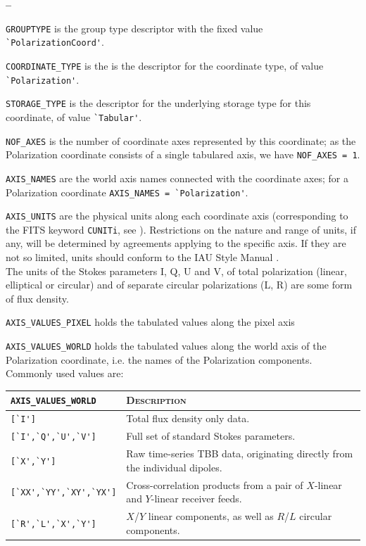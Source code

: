 \documentclass[a4paper,10pt,bibtotoc]{scrreprt}
\begin{document}
\begin{list}{\textbf{--}}{}
\item \verb|GROUPTYPE| is the group type descriptor with the fixed
  value \verb|`PolarizationCoord'|.
\item \verb|COORDINATE_TYPE| is the is the descriptor for the
  coordinate type, of value \verb|`Polarization'|.
\item \verb|STORAGE_TYPE| is the descriptor for the underlying storage
  type for this coordinate, of value \verb|`Tabular'|.
\item \verb|NOF_AXES| is the number of coordinate axes represented by
  this coordinate; as the Polarization coordinate consists of a single
  tabulared axis, we have \verb|NOF_AXES = 1|.
\item \verb|AXIS_NAMES| are the world axis names connected with the
  coordinate axes; for a Polarization coordinate \verb|AXIS_NAMES = `Polarization'|.
\item \verb|AXIS_UNITS| are the physical units along each coordinate axis
  (corresponding to the FITS keyword \verb|CUNITi|, see \cite{fits.paper1}).
  Restrictions on the nature and range of units, if any, will be determined by
  agreements applying to the specific axis. If they are not so limited, units
  should conform to the IAU Style Manual \cite{mcnally.1988}. \\ The
  units of the Stokes parameters I, Q, U and V, of total polarization
  (linear, elliptical or circular) and of separate circular
  polarizations (L, R) are some form of flux density. 
\item \verb|AXIS_VALUES_PIXEL| holds the tabulated values along the pixel axis
\item \verb|AXIS_VALUES_WORLD| holds the tabulated values along the world
  axis of the Polarization coordinate, i.e. the names of the Polarization
  components. Commonly used values are:
  \begin{center}
    \begin{tabular}{lp{10cm}}
      \verb|AXIS_VALUES_WORLD| & \textsc{Description} \\
      \hline
      \verb|[`I']| & Total flux density only data. \\
      \verb|[`I',`Q',`U',`V']| & Full set of standard Stokes
      parameters. \\
      \verb|[`X',`Y']| & Raw time-series TBB data, originating
      directly from the individual dipoles. \\
      \verb|[`XX',`YY',`XY',`YX']| & Cross-correlation products from a
      pair of $X$-linear and $Y$-linear receiver feeds. \\
      \verb|[`R',`L',`X',`Y']| & $X$/$Y$ linear components, as well as
      $R$/$L$ circular components. \\
      \hline
    \end{tabular}
  \end{center}
  

\end{list}
\end{document}
